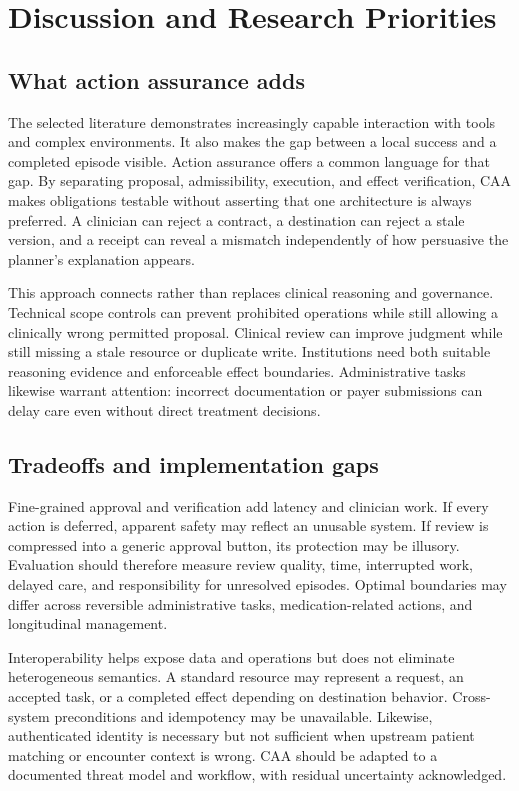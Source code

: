 \section{Discussion and Research Priorities}
\subsection{What action assurance adds}
The selected literature demonstrates increasingly capable interaction with tools and complex environments. It also makes the gap between a local success and a completed episode visible. Action assurance offers a common language for that gap. By separating proposal, admissibility, execution, and effect verification, CAA makes obligations testable without asserting that one architecture is always preferred. A clinician can reject a contract, a destination can reject a stale version, and a receipt can reveal a mismatch independently of how persuasive the planner's explanation appears.

This approach connects rather than replaces clinical reasoning and governance. Technical scope controls can prevent prohibited operations while still allowing a clinically wrong permitted proposal. Clinical review can improve judgment while still missing a stale resource or duplicate write. Institutions need both suitable reasoning evidence and enforceable effect boundaries. Administrative tasks likewise warrant attention: incorrect documentation or payer submissions can delay care even without direct treatment decisions.

\subsection{Tradeoffs and implementation gaps}
Fine-grained approval and verification add latency and clinician work. If every action is deferred, apparent safety may reflect an unusable system. If review is compressed into a generic approval button, its protection may be illusory. Evaluation should therefore measure review quality, time, interrupted work, delayed care, and responsibility for unresolved episodes. Optimal boundaries may differ across reversible administrative tasks, medication-related actions, and longitudinal management.

Interoperability helps expose data and operations but does not eliminate heterogeneous semantics. A standard resource may represent a request, an accepted task, or a completed effect depending on destination behavior. Cross-system preconditions and idempotency may be unavailable. Likewise, authenticated identity is necessary but not sufficient when upstream patient matching or encounter context is wrong. CAA should be adapted to a documented threat model and workflow, with residual uncertainty acknowledged.

